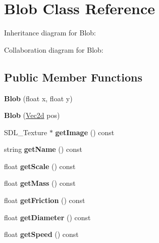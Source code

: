 \hypertarget{classBlob}{}\section{Blob Class Reference}
\label{classBlob}


Inheritance diagram for Blob\+:


Collaboration diagram for Blob\+:
\subsection*{Public Member Functions}
\begin{DoxyCompactItemize}
\item 
\mbox{\label{classBlob_a3e511bc294dbbf2106c02b45558ec08d}} 
{\bfseries Blob} (float x, float y)
\item 
\mbox{\label{classBlob_a584eced0e9c46bad200c5e89d3162729}} 
{\bfseries Blob} (\hyperlink{classVec2d}{Vec2d} pos)
\item 
\mbox{\label{classBlob_a31d12b4fc5cc1ee2dab8e5ceca7bf017}} 
S\+D\+L\+\_\+\+Texture $\ast$ {\bfseries get\+Image} () const
\item 
\mbox{\label{classBlob_ab1de84f385039ce5f0b7eca71a22249f}} 
string {\bfseries get\+Name} () const
\item 
\mbox{\label{classBlob_ad518901d1b30de2ac069a19f5d1105e3}} 
float {\bfseries get\+Scale} () const
\item 
\mbox{\label{classBlob_a707b797a661c2f590d1f33bb086c567f}} 
float {\bfseries get\+Mass} () const
\item 
\mbox{\label{classBlob_a1a1becb9b9fba6da3505f5fd5f70bee9}} 
float {\bfseries get\+Friction} () const
\item 
\mbox{\label{classBlob_a6c3e8195edeafdecbd87663d2d2a2e89}} 
float {\bfseries get\+Diameter} () const
\item 
\mbox{\label{classBlob_ab4c8c113c1790fdc3958c7e2492dc9e2}} 
float {\bfseries get\+Speed} () const
\end{DoxyCompactItemize}
